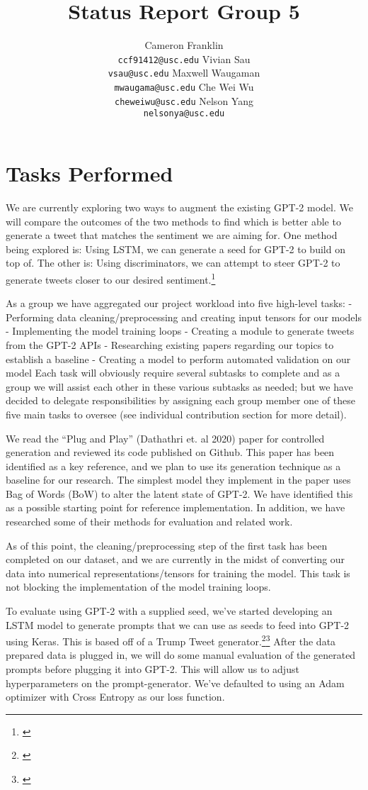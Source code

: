 \documentclass[12pt]{article}
\title{Status Report Group 5}
\author{Cameron Franklin \\
\texttt{ccf91412@usc.edu} \And
Vivian Sau \\
\texttt{vsau@usc.edu} \And
Maxwell Waugaman \\
\texttt{mwaugama@usc.edu} \AND
Che Wei Wu \\
\texttt{cheweiwu@usc.edu} \And
Nelson Yang \\
\texttt{nelsonya@usc.edu} \AND
\affil{Department of Computer Science \\
University of Southern California \\
Los Angeles, CA 90089 }}
\begin{document}
{\maketitle}

\section{Tasks Performed}
We are currently exploring two ways to augment the existing GPT-2 model.  We will compare the outcomes of the two methods to find which is better able to generate a tweet that matches the sentiment we are aiming for.  One method being explored is: Using LSTM, we can generate a seed for GPT-2 to build on top of. The other is: Using discriminators, we can attempt to steer GPT-2 to generate tweets closer to our desired sentiment.\footnote{\citep{DBLP:journals/corr/abs-1912-02164}}

As a group we have aggregated our project workload into five high-level tasks: 
- Performing data cleaning/preprocessing and creating input tensors for our models
- Implementing the model training loops
- Creating a module to generate tweets from the GPT-2 APIs
- Researching existing papers regarding our topics to establish a baseline
- Creating a model to perform automated validation on our model
Each task will obviously require several subtasks to complete and as a group we will assist each other in these various subtasks as needed; but we have decided to delegate responsibilities by assigning each group member one of these five main tasks to oversee (see individual contribution section for more detail).

We read the “Plug and Play” (Dathathri et. al 2020)  paper for controlled generation and reviewed its code published on Github. This paper has been identified as a key reference, and we plan to use its generation technique as a baseline for our research. The simplest model they implement in the paper uses Bag of Words (BoW) to alter the latent state of GPT-2. We have identified this as a possible starting point for reference implementation. In addition, we have researched some of their methods for evaluation and related work. 

As of this point, the cleaning/preprocessing step of the first task has been completed on our dataset, and we are currently in the midst of converting our data into numerical representations/tensors for training the model. This task is not blocking the implementation of the model training loops.

To evaluate using GPT-2 with a supplied seed, we’ve started developing an LSTM model to generate prompts that we can use as seeds to feed into GPT-2 using Keras. This is based off of a Trump Tweet generator.\footnote{\citep{morris_nevinchana_tam_2020}}\footnote{\citep{levy_2019}}  After the data prepared data is plugged in, we will do some manual evaluation of the generated prompts before plugging it into GPT-2.  This will allow us to adjust hyperparameters on the prompt-generator.  We’ve defaulted to using an Adam optimizer with Cross Entropy as our loss function.
\end{document}

